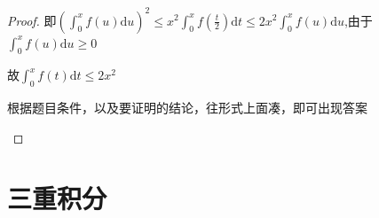 \begin{xiti}
\begin{proof}
		即$\left(\int_{0}^{x} f(u) \mathrm{d} u\right)^{2} \leqslant x^{2} \int_{0}^{x} f\left(\frac{t}{2}\right) \mathrm{d} t \leqslant 2x^{2}\int_{0}^{x} f\left(u\right) \mathrm{d} u$,由于$\int_{0}^{x} f\left(u\right) \mathrm{d} u \geqslant 0$
		
		故$\int_{0}^{x} f(t) \mathrm{d} t \leqslant 2 x^{2}$
		\begin{note}
			根据题目条件，以及要证明的结论，往形式上面凑，即可出现答案
		\end{note}
	\end{proof}
\end{xiti}



\section{三重积分}%
